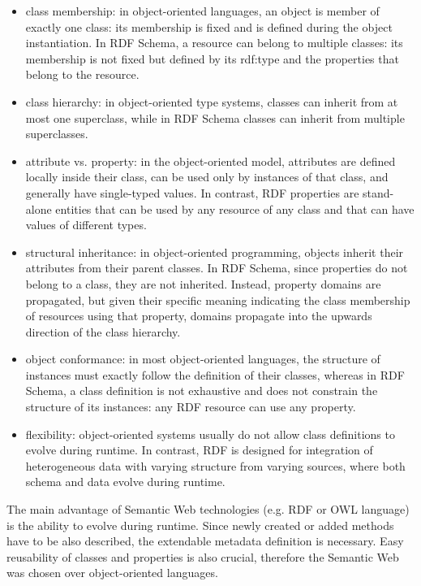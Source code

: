 \documentclass[a4paper,twoside]{article}
\begin{document}
\begin{itemize}

\item class membership:
in object-oriented languages,
an object is member of exactly one
class: its membership is fixed and is defined during the
object instantiation. In RDF Schema, a resource can
belong to multiple classes: its membership is not fixed
but defined by its rdf:type and the properties that
belong to the resource.

\item class hierarchy:
in object-oriented type systems, classes can inherit from
at most one superclass, while in RDF Schema classes
can inherit from multiple superclasses.

\item attribute vs. property:
in the object-oriented model,
attributes are defined locally inside their class, can be
used only by instances of that class, and generally have
single-typed values. In contrast, RDF properties are
stand-alone entities that can be used by any resource
of any class and that can have values of different types.

\item structural inheritance:
in object-oriented programming,
objects inherit their attributes from their parent classes.
In RDF Schema, since properties do not belong to a
class, they are not inherited.  Instead, property domains are propagated, but given their specific meaning indicating the class membership of resources using
that property, domains propagate into the upwards direction of the class hierarchy.

\item object conformance:
in most object-oriented languages,
the structure of instances must exactly follow the definition of their classes, whereas in RDF Schema, a class definition is not exhaustive and does not constrain the structure of its instances: any RDF resource can use
any property.

\item flexibility:
object-oriented systems usually do not allow class definitions to evolve during runtime. In contrast, RDF is designed for integration of heterogeneous
data with varying structure from varying sources, where
both schema and data evolve during runtime.

\end{itemize}

The main advantage of Semantic Web technologies (e.g. RDF or OWL language) is the ability to evolve during runtime. Since newly created or added methods have to be also described, the extendable metadata definition is necessary. Easy reusability of classes and properties is also crucial, therefore the Semantic Web was chosen over object-oriented languages.
\end{document}
